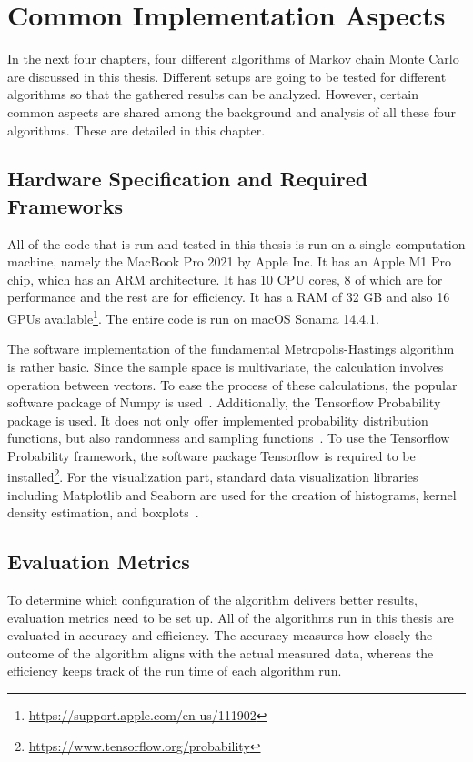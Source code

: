 \chapter{Common Implementation Aspects}
In the next four chapters, four different algorithms of Markov chain Monte Carlo are discussed in this thesis. Different setups are going to be tested for different algorithms so that the gathered results can be analyzed. However, certain common aspects are shared among the background and analysis of all these four algorithms. These are detailed in this chapter.

\section{Hardware Specification and Required Frameworks}
All of the code that is run and tested in this thesis is run on a single computation machine, namely the MacBook Pro 2021 by Apple Inc. It has an Apple M1 Pro chip, which has an ARM architecture. It has 10 CPU cores, 8 of which are for performance and the rest are for efficiency. It has a RAM of 32 GB and also 16 GPUs available\footnote{\url{https://support.apple.com/en-us/111902}}. The entire code is run on macOS Sonama 14.4.1.

The software implementation of the fundamental Metropolis-Hastings algorithm is rather basic. Since the sample space is multivariate, the calculation involves operation between vectors. To ease the process of these calculations, the popular software package of Numpy is used~\cite{numpy}. Additionally, the Tensorflow Probability package is used. It does not only offer implemented probability distribution functions, but also randomness and sampling functions~\cite{tfp}. To use the Tensorflow Probability framework, the software package Tensorflow is required to be installed\footnote{\url{https://www.tensorflow.org/probability}}. For the visualization part, standard data visualization libraries including Matplotlib and Seaborn are used for the creation of histograms, kernel density estimation, and boxplots~\cite{plt}.

\section{Evaluation Metrics}
To determine which configuration of the algorithm delivers better results, evaluation metrics need to be set up. All of the algorithms run in this thesis are evaluated in accuracy and efficiency. The accuracy measures how closely the outcome of the algorithm aligns with the actual measured data, whereas the efficiency keeps track of the run time of each algorithm run.

